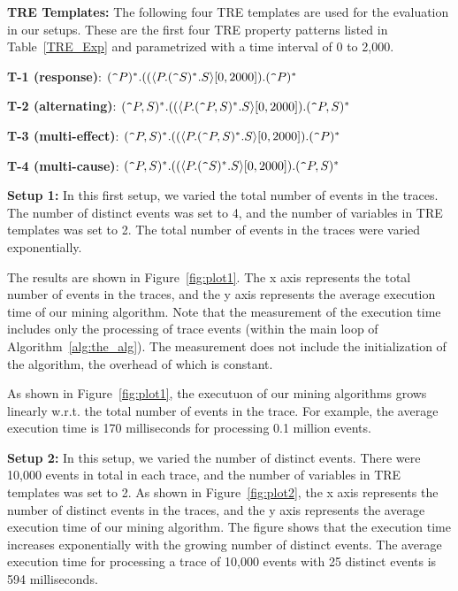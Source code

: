 \documentclass[]{sigplanconf}
\begin{document}
\vspace{3mm}

\noindent \textbf{TRE Templates:} The following four TRE templates are used for the evaluation in our setups. These are the first four TRE property patterns listed in Table~\ref{TRE_Exp} and parametrized with a time interval of 0 to 2,000.
\vspace{2mm}

\noindent \textbf{T-1 (response)}: $(\verb!^!P)^*.((\langle P.(\verb!^!S)^*.S\rangle[0, 2000]).(\verb!^!P)^*$

\noindent \textbf{T-2 (alternating)}: $(\verb!^!P,S)^*.((\langle P.(\verb!^!P,S)^*.S\rangle[0, 2000]).(\verb!^!P,S)^*$

\noindent \textbf{T-3 (multi-effect)}: $(\verb!^!P,S)^*.((\langle P.(\verb!^!P,S)^*.S\rangle[0, 2000]).(\verb!^!P)^*$

\noindent \textbf{T-4 (multi-cause)}: $(\verb!^!P,S)^*.((\langle P.(\verb!^!S)^*.S\rangle[0, 2000]).(\verb!^!P,S)^*$


\vspace{3mm}

\noindent \textbf{Setup 1:}
In this first setup, we varied the total number of events in the traces. The number of distinct events was set to 4, and the number of variables in TRE templates was set to 2. The total number of events in the traces were varied exponentially.

The results are shown in Figure~\ref{fig:plot1}. The x axis represents the total number of events in the traces, and the y axis represents the average execution time of our mining algorithm. Note that the measurement of the execution time includes only the processing of trace events (within the main loop of Algorithm~\ref{alg:the_alg}). The measurement does not include the initialization of the algorithm, the overhead of which is constant.

As shown in Figure~\ref{fig:plot1}, the executuon of our mining algorithms grows linearly w.r.t. the total number of events in the trace. For example, the average execution time is 170 milliseconds for processing 0.1 million events.

\vspace{3mm}

\noindent \textbf{Setup 2:}
In this setup, we varied the number of distinct events. There were 10,000 events in total in each trace, and the number of variables in TRE templates was set to 2. As shown in Figure~\ref{fig:plot2}, the x axis represents the number of distinct events in the traces, and the y axis represents the average execution time of our mining algorithm. The figure shows that the execution time increases exponentially with the growing number of distinct events. The average execution time for processing a trace of 10,000 events with 25 distinct events is 594 milliseconds.
\end{document}
